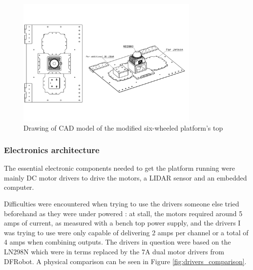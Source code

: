 \documentclass[12pt]{article}
\begin{document}
        \begin{figure}[H]
            \centering
            \includegraphics[width=0.8\textwidth]{Images/RoverV1.pdf}
            \caption{Drawing of CAD model of the modified six-wheeled platform's top}
            \label{fig:full_cad_model}
        \end{figure}

        \subsubsection{Electronics architecture}
            The essential electronic components needed to get the platform running were mainly DC motor drivers to drive the motors, a LIDAR sensor and an embedded computer.
            
            Difficulties were encountered when trying to use the drivers someone else tried beforehand as they were under powered : at stall, the motors required around 5 amps of current, as measured with a bench top power supply, and the drivers I was trying to use were only capable of delivering 2 amps per channel or a total of 4 amps when combining outputs. The drivers in question were based on the LN298N which were in terms replaced by the 7A dual motor drivers from DFRobot. A physical comparison can be seen in Figure \ref{fig:drivers_comparison}.
        
\end{document}
